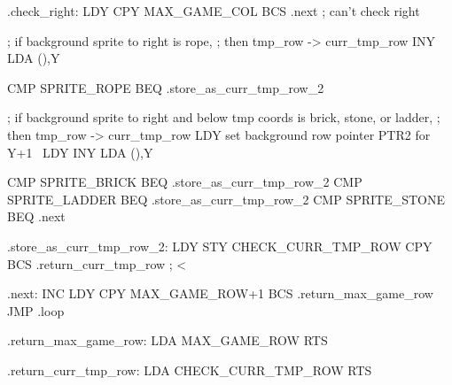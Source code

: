 \documentclass[10pt]{report}%
\begin{document}
.check_right:
    LDY     
    CPY     MAX_GAME_COL
    BCS     .next           ; can't check right

    ; if background sprite to right is rope,
    ; then tmp_row -> curr_tmp_row
    INY
    LDA     (),Y

    CMP     SPRITE_ROPE
    BEQ     .store_as_curr_tmp_row_2

    ; if background sprite to right and below tmp coords is brick, stone, or ladder,
    ; then tmp_row -> curr_tmp_row
    LDY     
    \LA{}set background row pointer \code{}PTR2\edoc{} for \code{}Y+1\edoc{}~{\nwtagstyle{}}\RA{}
    LDY     
    INY
    LDA     (),Y

    CMP     SPRITE_BRICK
    BEQ     .store_as_curr_tmp_row_2
    CMP     SPRITE_LADDER
    BEQ     .store_as_curr_tmp_row_2
    CMP     SPRITE_STONE
    BEQ     .next

.store_as_curr_tmp_row_2:
    LDY     
    STY     CHECK_CURR_TMP_ROW
    CPY     
    BCS     .return_curr_tmp_row
    ;  < 

.next:
    INC     
    LDY     
    CPY     MAX_GAME_ROW+1
    BCS     .return_max_game_row
    JMP     .loop

.return_max_game_row:
    LDA     MAX_GAME_ROW
    RTS

.return_curr_tmp_row:
    LDA     CHECK_CURR_TMP_ROW
    RTS
\nwendcode{}\nwdocspar
\end{document}
